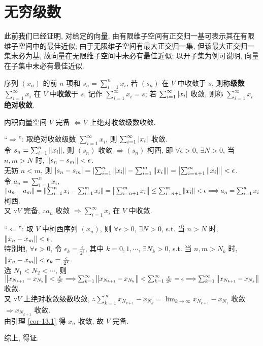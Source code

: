 \documentclass{note}
\begin{document}
\section{无穷级数}
此前我们已经证明, 对给定的向量, 由有限维子空间有正交归一基可表示其在有限维子空间中的最佳近似; 由于无限维子空间有最大正交归一集, 但该最大正交归一集未必为基, 故向量在无限维子空间中未必有最佳近似; 以开子集为例可说明, 向量在子集中未必有最佳近似.

\begin{df}[级数收敛和绝对收敛]
    序列 $(x_n)$ 的前 $n$ 项和 $s_n=\sum_{i=1}^nx_i$, 若 $(s_n)$ 在 $V$ 中收敛于 $s$, 则称\textbf{级数} $\sum_{i=1}^{\infty}x_i$ 在 $V$ 中\textbf{收敛}于 $s$, 记作 $\sum_{i=1}^{\infty}x_i=s$; 若 $\sum_{i=1}^{\infty}\left\lvert x_i\right\rvert$ 收敛, 则称 $\sum_{i=1}^{\infty}x_i$ \textbf{绝对收敛}.
\end{df}

\begin{thm}
    内积向量空间 $V$ 完备 $\Longleftrightarrow V$ 上绝对收敛级数收敛.
\end{thm}
\begin{pf}
    ``$\Longrightarrow$'': 取绝对收敛级数 $\sum_{i=1}^{\infty}x_i$, 则 $\sum_{i=1}^{\infty}\left\lvert x_i\right\rvert$ 收敛.\\
    令 $s_n=\sum_{i=1}^n\left\lVert x_i\right\rVert$, 则 $(s_n)$ 收敛 $\Longrightarrow(s_n)$ 柯西, 即 $\forall\epsilon>0$, $\exists N>0$, 当 $n,m>N$ 时, $\left\lVert s_n-s_m\right\rVert<\epsilon$.\\
    无妨 $n<m$, 则 $\left\lvert s_n-s_m\right\rvert=\left\lvert\sum_{i=1}^n\left\lVert x_i\right\rVert-\sum_{i=1}^m\left\lVert x_i\right\rVert\right\rvert=\left\lvert\sum_{i=n+1}^m\left\lVert x_i\right\rVert\right\rvert<\epsilon$.\\
    令 $a_n=\sum_{i=1}^nx_i$, $\left\lVert a_n-a_m\right\rVert=\left\lVert\sum_{i=1}^nx_i-\sum_{i=1}^mx_i\right\rVert=\left\lVert\sum_{i=n+1}^mx_i\right\rVert\leq\sum_{i=n+1}^m\left\lVert x_i\right\rVert<\epsilon\Longrightarrow a_n=\sum_{i=1}^nx_i$ 柯西.\\
    又 $\because V$ 完备, $\therefore a_n$ 收敛 $\Longrightarrow\sum_{i=1}^{\infty}x_i$ 在 $V$ 中收敛.

    ``$\Longleftarrow$'': 取 $V$ 中柯西序列 $(x_n)$, 则 $\forall\epsilon>0$, $\exists N>0$, s.t. 当 $n>N$ 时, $\left\lVert x_n-x_m\right\rVert<\epsilon$.\\
    特别地, $\forall\epsilon>0$, 令 $\epsilon_k=\frac{\epsilon}{2^k}$, 其中 $k=0,1,\cdots$, $\exists N_k>0$, s.t. 当 $n,m>N_k$ 时, $\left\lVert x_n-x_m\right\rVert<\epsilon_k=\frac{\epsilon}{2^k}$.\\
    选 $N_1<N_2<\cdots$, 则 $\left\lVert x_{N_{k+1}}-x_{N_k}\right\rVert<\frac{\epsilon}{2^k}\Longrightarrow\sum_{k=1}^{\infty}\left\lVert x_{N_{k+1}}-x_{N_k}\right\rVert<\sum_{k=1}^{\infty}\frac{\epsilon}{2^k}=\epsilon\Longrightarrow\sum_{k=1}^{\infty}\left\lVert x_{N_{k+1}}-x_{N_k}\right\rVert$ 收敛.\\
    又 $\because V$ 上绝对收敛级数收敛, $\therefore\sum_{k=1}^{\infty}x_{N_{k+1}}-x_{N_k}=\lim_{k\rightarrow\infty}x_{N_{k+1}}-x_{N_1}$ 收敛 $\Longrightarrow x_{N_{k+1}}$ 收敛.\\
    由引理 \ref{cor-13.1} 得 $x_n$ 收敛, 故 $V$ 完备.

    综上, 得证.
\end{pf}
\end{document}
